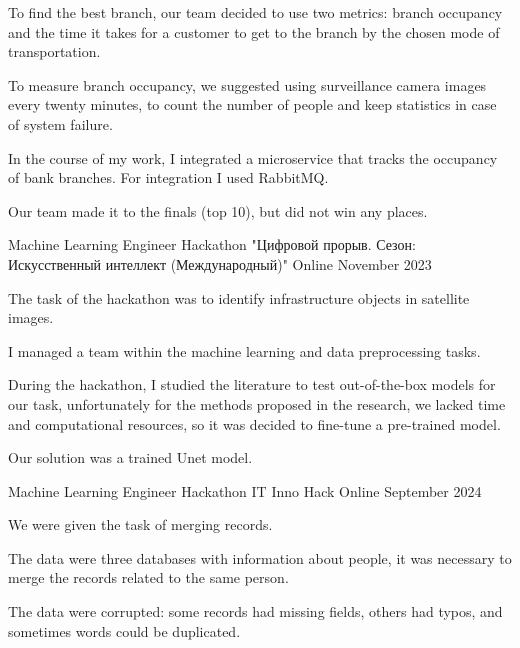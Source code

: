 \begin{cventries}
{\begin{cvitems}
    \item {To find the best branch, our team decided to use two metrics: branch occupancy and the time it takes for a customer to get to the branch by the chosen mode of transportation. }
    \item {To measure branch occupancy, we suggested using surveillance camera images every twenty minutes, to count the number of people and keep statistics in case of system failure.}
    \item {In the course of my work, I integrated a microservice that tracks the occupancy of bank branches. For integration I used RabbitMQ. }
    \item {Our team made it to the finals (top 10), but did not win any places. }
  \end{cvitems}
}
\cventry
{Machine Learning Engineer} %
{Hackathon "Цифровой прорыв. Сезон: Искусственный интеллект (Международный)"} %
{Online} %
{November 2023} %
{
  \begin{cvitems} %
    \item {The task of the hackathon was to identify infrastructure objects in satellite images. }
    \item {I managed a team within the machine learning and data preprocessing tasks. }
    \item {During the hackathon, I studied the literature to test out-of-the-box models for our task, unfortunately for the methods proposed in the research, we lacked time and computational resources, so it was decided to fine-tune a pre-trained model. }
    \item {Our solution was a trained Unet model. } 
  \end{cvitems}
}
\cventry
{Machine Learning Engineer} %
{Hackathon IT Inno Hack} %
{Online} %
{September 2024} %
{
  \begin{cvitems} %
    \item {We were given the task of merging records. }
    \item {The data were three databases with information about people, it was necessary to merge the records related to the same person. }
    \item {The data were corrupted: some records had missing fields, others had typos, and sometimes words could be duplicated. }

\end{cvitems}}
\end{cventries}
